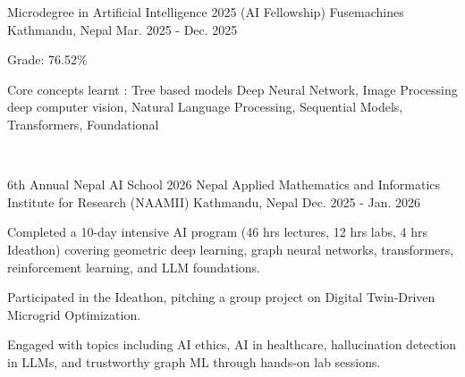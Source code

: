 

\begin{cventries}

  \cventry
    {Microdegree in Artificial Intelligence 2025 (AI Fellowship)} %
    {Fusemachines} %
    {Kathmandu, Nepal} %
    {Mar. 2025 - Dec. 2025} %
    {
      \begin{cvitems} %
        \item {Grade: 76.52\%}
        \item {Core concepts learnt : Tree based models Deep Neural Network, Image Processing deep computer vision, Natural Language Processing, Sequential Models, Transformers, Foundational}
      \end{cvitems}
      ‎ 
    }

    \cventry
    {6th Annual Nepal AI School 2026} %
    {Nepal Applied Mathematics and Informatics Institute for Research (NAAMII)} %
    {Kathmandu, Nepal} %
    {Dec. 2025 - Jan. 2026} %
    {
      \begin{cvitems} %
        \item {Completed a 10-day intensive AI program (46 hrs lectures, 12 hrs labs, 4 hrs Ideathon) covering geometric deep learning, graph neural networks, transformers, reinforcement learning, and LLM foundations.}
        \item {Participated in the Ideathon, pitching a group project on Digital Twin-Driven Microgrid Optimization.}
        \item {Engaged with topics including AI ethics, AI in healthcare, hallucination detection in LLMs, and trustworthy graph ML through hands-on lab sessions.}
      \end{cvitems}
    }
\end{cventries}
